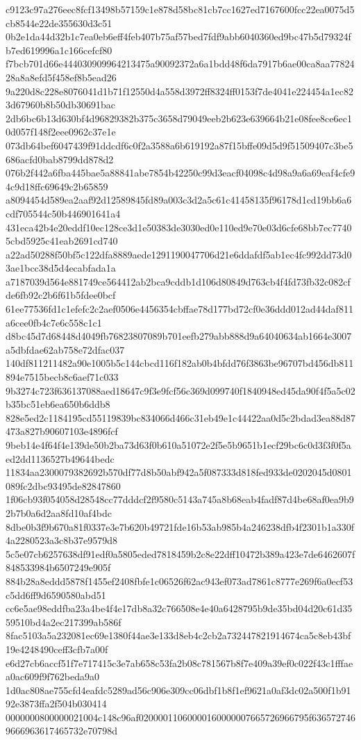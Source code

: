 {c9123c97a276eec8fcf13498b57159c1e878d58bc81cb7cc1627ed7167600fcc22ea0075d5cb8544e22de355630d3c51
0b2e1da44d32b1c7ea0eb6eff4feb407b75af57bed7fdf9abb6040360ed9bc47b5d79324fb7ed619996a1c166cefcf80
f7bcb701d66e444030909964213475a90092372a6a1bdd48f6da7917b6ae00ca8aa7782428a8a8efd5f458ef8b5ead26
9a220d8c228e8076041d1b71f12550d4a558d3972ff8324ff0153f7de4041e224454a1ec823d67960b8b50db30691bac
2db6bc6b13d630bf4d96829382b375c3658d79049eeb2b623e639664b21e08fee8ce6ec10d057f148f2eee0962c37e1e
073db64bef6047439f91ddcdf6c0f2a3588a6b619192a87f15bffe09d5d9f51509407c3be5686acfd0bab8799dd878d2
076b2f442a6fba445bae5a88841abe7854b42250c99d3eacf04098c4d98a9a6a69eaf4cfe94c9d18ffc69649c2b65859
a8094454d589ea2aaf92d12589845fd89a003c3d2a5c61c41458135f96178d1cd19bb6a6cdf705544c50b446901641a4
431eca42b4e20eddf10ec128ce3d1e50383de3030ed0e110ed9e70e03d6cfe68bb7ec77405cbd5925c41eab2691cd740
a22ad50288f50bf5c122dfa8889aede1291190047706d21e6ddafdf5ab1ec4fc992dd73d03ae1bcc38d5d4ecabfada1a
a7187039d564e881749ce564412ab2bca9cddb1d106d80849d763cb4f4fd73fb32c082cfde6fb92c2b6f61b5fdee0bcf
61ee77536fd1c1efefc2c2aef0506e4456354cbffae78d177bd72cf0e36ddd012ad44daf811a6cee0fb4c7e6c558c1c1
d8bc45d7d68448d4049fb76823807089b701eefb279abb888d9a64040634ab1664e3007a5dbfdae62ab758e72dfac037
140df811211482a90e1005b5c144cbcd116f182ab0b4bfdd76f3863be96707bd456db811894e7515becb8c6aef71c033
9b3274c723f636137088aed18647c9f3e9fcf56c369d099740f1840948ed45da90f4f5a5c02b35bc51eb6ea650b6ddb8
828e5ed2c1184195cd55119839bc834066d466c31eb49e1c44422aa0d5c2bdad3ea88d87473a827b90607103e4896fcf
9beb14e4f64f4e139de50b2ba73d63f0b610a51072e2f5e5b9651b1ecf29bc6c0d3f3f0f5aed2dd1136527b49644bedc
11834aa2300079382692b570df77d8b50abf942a5f087333d818fed933de0202045d0801089fc2dbc93495de82847860
1f06cb93f054058d28548cc77dddcf2f9580c5143a745a8b68eab4fadf87d4be68af0ea9b92b7b0a6d2aa8fd10af4bdc
8dbe0b3f9b670a81f0337e3e7b620b49721fde16b53ab985b4a246238dfb4f2301b1a330f4a2280523a3c8b37e9579d8
5c5e07cb6257638df91edf0a5805eded7818459b2c8e22dff10472b389a423e7de6462607f848533984b6507249e905f
884b28a8eddd5878f1455ef2408fbfe1c06526f62ac943ef073ad7861c8777e269f6a0ecf53c5dd6ff9d6590580abd51
cc6e5ae98eddfba23a4be4f4e17db8a32c766508e4e40a6428795b9de35bd04d20c61d3559510bd4a2ec217399ab586f
8fac5103a5a232081ec69e1380f44ae3e133d8eb4c2cb2a732447821914674ca5c8eb43bf19e4248490ceff3cfb7a00f
e6d27cb6accf51f7e717415c3e7ab658c53fa2b08c781567b8f7e409a39ef0c022f43c1fffaea0ac609f9f762beda9a0
1d0ac808ae755cfd4eafdc5289ad56c906e309cc06dbf1b8f1ef9621a0af3dc02a500f1b9192e3873ffa2f504b030414
0000000800000021004c148c96af02000011060000160000007665726966795f6365727469666963617465732e70798d
}
